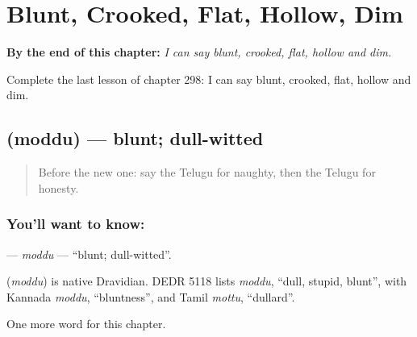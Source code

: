 
\chapter{Blunt, Crooked, Flat, Hollow, Dim}
\label{ch:te-blunt-crooked-flat-hollow-dim}

\begin{chapteropening}
\textbf{By the end of this chapter:} \emph{I can say blunt, crooked, flat, hollow and dim.}

Complete the last lesson of chapter 298: I can say blunt, crooked, flat, hollow and dim.
\end{chapteropening}

\section[\texorpdfstring{\te{మొద్దు} (moddu)}{మొద్దు (moddu)}]{ (moddu) — blunt; dull-witted}

\label{lesson:TE-C298-moddu}



\begin{quote}
Before the new one: say the Telugu for naughty, then the Telugu for honesty.
\end{quote}

\subsection*{You'll want to know: }
\textbf{} — \emph{moddu} — \textquotedblleft{}blunt; dull-witted\textquotedblright{}.

\begin{cousinweb}
\textbf{} (\emph{moddu}) is native Dravidian. DEDR 5118 lists \emph{moddu}, \textquotedblleft{}dull, stupid, blunt\textquotedblright{}, with Kannada \emph{moddu}, \textquotedblleft{}bluntness\textquotedblright{}, and Tamil \emph{mottu}, \textquotedblleft{}dullard\textquotedblright{}.
\end{cousinweb}

\begin{grammarlens}[title={What you've built}]
One more word for this chapter.
\end{grammarlens}

